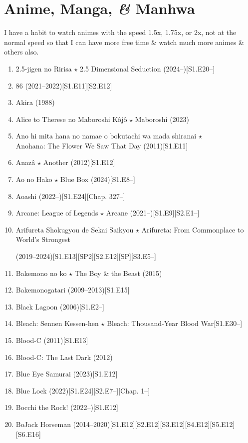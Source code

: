\documentclass{article}
\begin{document}
\section{Anime, Manga, {\it\&} Manhwa}
I have a habit to watch animes with the speed 1.5x, 1.75x, or 2x, not at the normal speed so that I can have more free time \& watch much more animes \& others also.
\begin{enumerate}
	\item 2.5-jigen no Ririsa $\star$ 2.5 Dimensional Seduction (2024--)\hfill[S1.E20--]
	\item 86 (2021--2022)\hfill[S1.E11][S2.E12]
    \item {\sc Akira} (1988)
    \item {\sc Alice to Therese no Maboroshi Kôjô $\star$ Maboroshi} (2023)
    \item {\sc Ano hi mita hana no namae o bokutachi wa mada shiranai $\star$\\Anohana: The Flower We Saw That Day} (2011)\hfill[S1.E11]
    \item {\sc Anazâ $\star$ Another} (2012)\hfill[S1.E12]
    \item Ao no Hako $\star$ Blue Box (2024)\hfill[S1.E8--]
    \item Aoashi (2022--)\hfill[S1.E24][Chap. 327--]
    \item {\sc Arcane: League of Legends $\star$ Arcane} (2021--)\hfill[S1.E9][S2.E1--]
    \item  Arifureta Shokugyou de Sekai Saikyou $\star$ Arifureta: From Commonplace to World's Strongest
    
    (2019--2024)\hfill[S1.E13][SP2][S2.E12][SP][S3.E5--]
    \item {\sc Bakemono no ko $\star$ The Boy \& the Beast} (2015)
    \item {\sc Bakemonogatari} (2009--2013)\hfill[S1.E15]
    \item Black Lagoon (2006)\hfill[S1.E2--]
    \item Bleach: Sennen Kessen-hen $\star$ Bleach: Thousand-Year Blood War\hfill[S1.E30--]
    \item {\sc Blood-C} (2011)\hfill[S1.E13]
    \item Blood-C: The Last Dark (2012)
    \item {\sc Blue Eye Samurai} (2023)\hfill[S1.E12]
    \item Blue Lock (2022)\hfill[S1.E24][S2.E7--][Chap. 1--]
    \item Bocchi the Rock! (2022--)\hfill[S1.E12]
    \item {\sc BoJack Horseman} (2014--2020)\hfill[S1.E12][S2.E12][S3.E12][S4.E12][S5.E12][S6.E16]
    

\end{enumerate}
\end{document}
